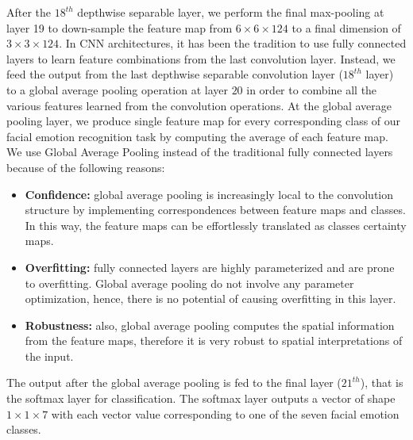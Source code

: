 \documentclass[master]{thesis-uestc}
\begin{document}
After the $18^{th}$ depthwise separable layer, we perform the final max-pooling at layer 19 to down-sample the feature map from $6 \times 6 \times 124$ to a final dimension of $3 \times 3 \times 124$. In CNN architectures, it has been the tradition to use fully connected layers to learn feature combinations from the last convolution layer. Instead, we feed the output from the last depthwise separable convolution layer ($18^{th}$ layer) to a global average pooling operation at layer $20$ in order to combine all the various features learned from the convolution operations. At the global average pooling layer, we produce single feature map for every corresponding class of our facial emotion recognition task by computing the average of each feature map. We use Global Average Pooling instead of the traditional fully connected layers because of the following reasons:
\begin{itemize}
    \item \textbf{Confidence:} global average pooling is increasingly local to the convolution structure by implementing correspondences between feature maps and classes. In this way, the feature maps can be effortlessly translated as classes certainty maps.
    \item \textbf{Overfitting:} fully connected layers are highly parameterized and are prone to overfitting. Global average pooling do not involve any parameter optimization, hence, there is no potential of causing overfitting in this layer.
    \item \textbf{Robustness: } also, global average pooling computes the spatial information from the feature maps, therefore it is very robust to spatial interpretations of the input.
\end{itemize}
The output after the global average pooling is fed to the final layer ($21^{th}$), that is the softmax layer for classification. The softmax layer outputs a vector of shape $1 \times 1 \times 7$ with each vector value corresponding to one of the seven facial emotion classes.
\end{document}
